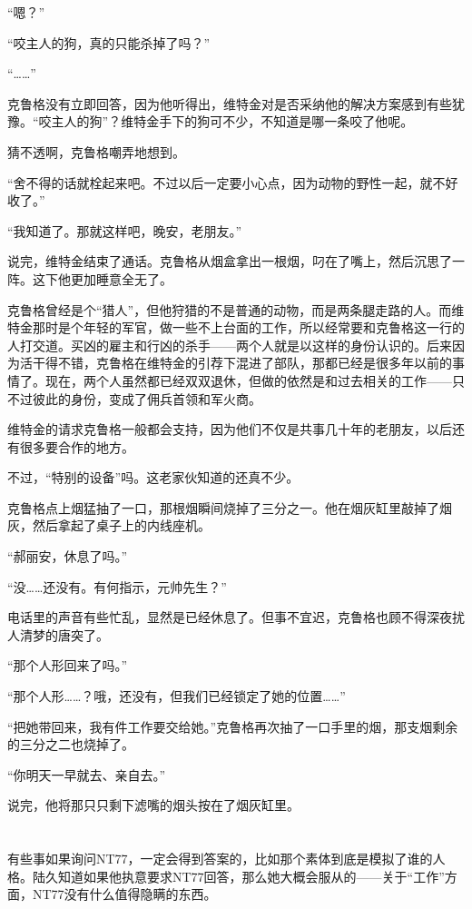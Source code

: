 “嗯？”

“咬主人的狗，真的只能杀掉了吗？”

“……”

克鲁格没有立即回答，因为他听得出，维特金对是否采纳他的解决方案感到有些犹豫。“咬主人的狗”？维特金手下的狗可不少，不知道是哪一条咬了他呢。

猜不透啊，克鲁格嘲弄地想到。

“舍不得的话就栓起来吧。不过以后一定要小心点，因为动物的野性一起，就不好收了。”

“我知道了。那就这样吧，晚安，老朋友。”

说完，维特金结束了通话。克鲁格从烟盒拿出一根烟，叼在了嘴上，然后沉思了一阵。这下他更加睡意全无了。

克鲁格曾经是个“猎人”，但他狩猎的不是普通的动物，而是两条腿走路的人。而维特金那时是个年轻的军官，做一些不上台面的工作，所以经常要和克鲁格这一行的人打交道。买凶的雇主和行凶的杀手——两个人就是以这样的身份认识的。后来因为活干得不错，克鲁格在维特金的引荐下混进了部队，那都已经是很多年以前的事情了。现在，两个人虽然都已经双双退休，但做的依然是和过去相关的工作——只不过彼此的身份，变成了佣兵首领和军火商。

维特金的请求克鲁格一般都会支持，因为他们不仅是共事几十年的老朋友，以后还有很多要合作的地方。

不过，“特别的设备”吗。这老家伙知道的还真不少。

克鲁格点上烟猛抽了一口，那根烟瞬间烧掉了三分之一。他在烟灰缸里敲掉了烟灰，然后拿起了桌子上的内线座机。

“郝丽安，休息了吗。”

“没……还没有。有何指示，元帅先生？”

电话里的声音有些忙乱，显然是已经休息了。但事不宜迟，克鲁格也顾不得深夜扰人清梦的唐突了。

“那个人形回来了吗。”

“那个人形……？哦，还没有，但我们已经锁定了她的位置……”

“把她带回来，我有件工作要交给她。”克鲁格再次抽了一口手里的烟，那支烟剩余的三分之二也烧掉了。

“你明天一早就去、亲自去。”

说完，他将那只只剩下滤嘴的烟头按在了烟灰缸里。

\section*{}

有些事如果询问NT77，一定会得到答案的，比如那个素体到底是模拟了谁的人格。陆久知道如果他执意要求NT77回答，那么她大概会服从的——关于“工作”方面，NT77没有什么值得隐瞒的东西。

